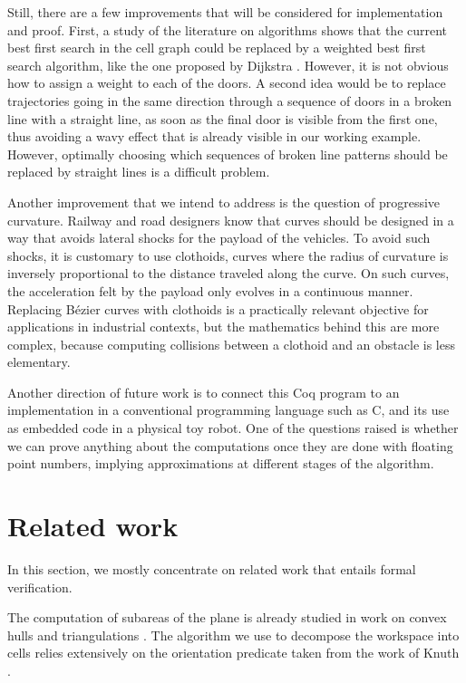 \documentclass{llncs}
\begin{document}
Still, there are a few improvements that will be considered for
implementation and proof.  First, a study of the literature on
algorithms shows that the current best first search in the cell graph
could be replaced by a weighted best first search algorithm, like the
one proposed by Dijkstra \cite{Dijkstra1959}.  However, it is not
obvious how to assign a weight to each of the doors.  A second idea
would be to replace trajectories going in the same direction through a
sequence of doors in a broken line with a straight line, as soon as
the final door is visible from the first one, thus avoiding a wavy
effect that is already visible in our working example.
However, optimally choosing which sequences of broken line patterns
should be replaced by straight lines is a difficult problem.

Another improvement that we intend to address is the question of
progressive curvature.  Railway and road designers know that curves
should be designed in a way that avoids lateral shocks for the payload
of the vehicles.  To avoid such shocks, it is customary to use
clothoids, curves where the radius of curvature is inversely
proportional to the distance traveled along the curve.  On such
curves, the acceleration felt by the payload only evolves in a
continuous manner.  Replacing Bézier curves with clothoids is a
practically relevant objective for applications in industrial
contexts, but the mathematics behind this are more complex, because
computing collisions between a clothoid and an obstacle is less elementary.

Another direction of future work is to connect this Coq program to an
implementation in a conventional programming language such as C, and
its use as embedded code in a physical toy robot.  One of the
questions raised is whether we can prove anything about the
computations once they are done with floating point numbers, implying
approximations at different stages of the algorithm.
\section{Related work}
In this section, we mostly concentrate on related work that entails formal
verification.

The computation of subareas of the plane is already studied in work
on convex hulls \cite{PichardieBertot01} and triangulations
\cite{DufourdBertot10,Bertot18}.  The algorithm we use to decompose
the workspace into cells relies extensively on the orientation
predicate taken from the work of Knuth \cite{KnuthAxiomsAndHulls}.
\end{document}
